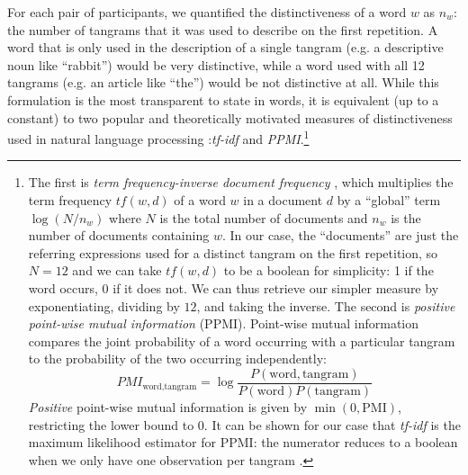 \documentclass[alpha-refs]{wiley-article}
\begin{document}
For each pair of participants, we quantified the distinctiveness of a word $w$ as $n_w$: the number of tangrams that it was used to describe on the first repetition. 
A word that is only used in the description of a single tangram (e.g. a descriptive noun like ``rabbit'') would be very distinctive, while a word used with all 12 tangrams (e.g. an article like ``the'') would be not distinctive at all.
While this formulation is the most transparent to state in words, it is equivalent (up to a constant) to two popular  and theoretically motivated measures of distinctiveness used in natural language processing \citep{salton1988term}:\emph{tf-idf} and \emph{PPMI}.\footnote{
The first is \emph{term frequency-inverse document frequency} \citep[tf-idf,][]{sparck1972statistical}, which multiplies the term frequency $tf(w,d)$ of a word $w$ in a document $d$ by a ``global'' term $\log(N/n_w)$ where $N$ is the total number of documents and $n_w$ is the number of documents containing $w$. 
In our case, the ``documents'' are just the referring expressions used for a distinct tangram on the first repetition, so $N=12$ and we can take $tf(w,d)$ to be a boolean for simplicity: 1 if the word occurs, 0 if it does not.
We can thus retrieve our simpler measure by exponentiating, dividing by $12$, and taking the inverse.
The second is \emph{positive point-wise mutual information} (PPMI). 
Point-wise mutual information compares the joint probability of a word occurring with a particular tangram to the probability of the two occurring independently: 
$$PMI_{\textrm{word},\textrm{tangram}} = \log\frac{P(\textrm{word}, \textrm{tangram})}{P(\textrm{word})P(\textrm{tangram})}$$
\emph{Positive} point-wise mutual information is given by $\min(0, \textrm{PMI})$, restricting the lower bound to 0. 
It can be shown for our case that \emph{tf-idf} is the maximum likelihood estimator for PPMI: the numerator reduces to a boolean when we only have one observation per tangram \citep{robertson2004understanding}.}
%
\end{document}
